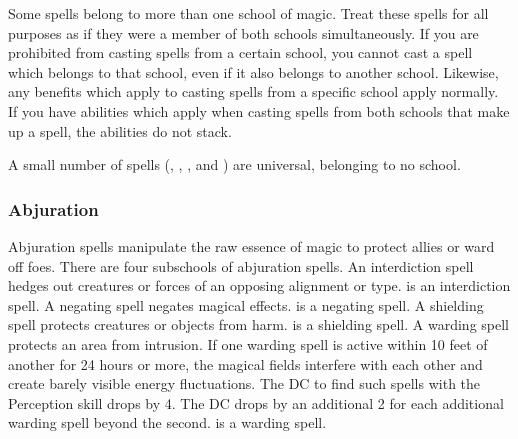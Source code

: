Some spells belong to more than one school of magic. Treat these spells for all purposes as if they were a member of both schools simultaneously. If you are prohibited from casting spells from a certain school, you cannot cast a spell which belongs to that school, even if it also belongs to another school. Likewise, any benefits which apply to casting spells from a specific school apply normally. If you have abilities which apply when casting spells from both schools that make up a spell, the abilities do not stack.

A small number of spells (, , , and ) are universal, belonging to no school.

\subsubsection{Abjuration}
Abjuration spells manipulate the raw essence of magic to protect allies or ward off foes. There are four subschools of abjuration spells.
 An interdiction spell hedges out creatures or forces of an opposing alignment or type.  is an interdiction spell.
 A negating spell negates magical effects.  is a negating spell.
 A shielding spell protects creatures or objects from harm.  is a shielding spell.
 A warding spell protects an area from intrusion. If one warding spell is active within 10 feet of another for 24 hours or more, the magical fields interfere with each other and create barely visible energy fluctuations. The DC to find such spells with the Perception skill drops by 4. The DC drops by an additional 2 for each additional warding spell beyond the second.  is a warding spell.

